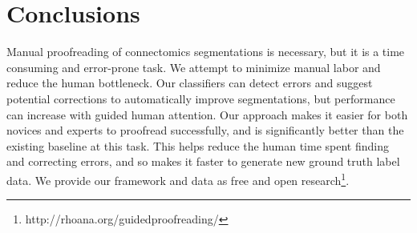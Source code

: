 \section{Conclusions}


Manual proofreading of connectomics segmentations is necessary, but it is a time consuming and error-prone task. We attempt to minimize manual labor and reduce the human bottleneck. Our classifiers can detect errors and suggest potential corrections to automatically improve segmentations, but performance can increase with guided human attention. Our approach makes it easier for both novices and experts to proofread successfully, and is significantly better than the existing baseline at this task. This helps reduce the human time spent finding and correcting errors, and so makes it faster to generate new ground truth label data. We provide our framework and data as free and open research\footnote{\scriptsize{http://rhoana.org/guidedproofreading/}}.

